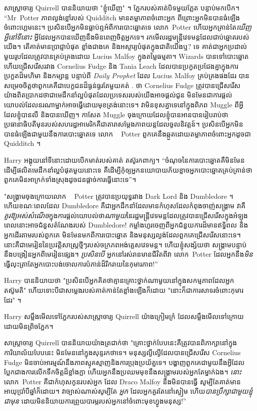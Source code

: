 សាស្រ្តាចារ្យ Quirrell បាននិយាយថា "ខ្ញុំឃើញ" ។ ភ្នែករបស់គាត់បិទមួយភ្លែត បន្ទាប់មកបើក។ “Mr~Potter ភាពល្ងង់ខ្លៅរបស់ Quidditch មានតម្លាភាពចំពោះអ្នក ពីព្រោះអ្នកមិនបានធំឡើងចំពោះហ្គេមនេះ។ ប្រសិនបើអ្នកមិនធ្លាប់ឮអំពីការបោះឆ្នោតទេ លោក~Potter ហើយអ្នកគ្រាន់តែ\emph{ឃើញអ្វីនៅទីនោះ} អ្វីដែលអ្នកបានឃើញនឹងមិនពេញចិត្តអ្នកទេ។ រកមើលរដ្ឋមន្ត្រីវេទមន្តដែលជាប់ឆ្នោតរបស់យើង។ តើ​គាត់​មាន​ប្រាជ្ញា​បំផុត ខ្លាំង​ជាង​គេ និង​អស្ចារ្យ​បំផុត​ក្នុង​ជាតិ​យើង​ឬ? ទេ គាត់​ជា​អ្នក​ប្រដាល់​មួយ​រូប​ដែល​ត្រូវ​បាន​គ្រប់គ្រង​ដោយ​ Lucius Malfoy ក្នុង​តម្លៃ​ធម្មតា​។ Wizards បានទៅបោះឆ្នោត ហើយជ្រើសរើសរវាង Cornelius Fudge និង Tania Leach ដែលបានប្រកួតប្រជែងគ្នាក្នុងការប្រកួតដ៏មហិមា និងកម្សាន្ត បន្ទាប់ពី \emph{Daily Prophet} ដែល Lucius Malfoy គ្រប់គ្រងផងដែរ បានសម្រេចចិត្តថាពួកគេគឺជាបេក្ខជនដ៏ធ្ងន់ធ្ងរតែមួយគត់ . ថា Cornelius Fudge ត្រូវបានជ្រើសរើសយ៉ាងពិតប្រាកដថាជាមេដឹកនាំល្អបំផុតដែលប្រទេសរបស់យើងអាចផ្តល់ជូន មិនមែនជាការផ្តល់យោបល់ដែលនរណាម្នាក់អាចធ្វើដោយមុខត្រង់នោះទេ។ វាមិនខុសគ្នាទេនៅក្នុងពិភព Muggle ពីអ្វីដែលខ្ញុំបានលឺ និងបានឃើញ។ កាសែត Muggle ចុងក្រោយដែលខ្ញុំបានអានបានរៀបរាប់ថាប្រធានាធិបតីមុនរបស់សហរដ្ឋអាមេរិកគឺជាតារាសម្តែងភាពយន្តដែលចូលនិវត្តន៍។ ប្រសិនបើអ្នកមិនបានធំឡើងជាមួយនឹងការបោះឆ្នោតទេ លោក ~ Potter ពួកគេនឹងឆ្កួតដោយតម្លាភាពចំពោះអ្នកដូចជា Quidditch ។

Harry អង្គុយនៅទីនោះដោយបើកមាត់របស់គាត់ តស៊ូរកពាក្យ។ “ចំណុចនៃការបោះឆ្នោតគឺមិនមែនដើម្បីផលិតមេដឹកនាំល្អបំផុតមួយនោះទេ គឺដើម្បីកុំឲ្យអ្នកនយោបាយភ័យខ្លាចអ្នកបោះឆ្នោតគ្រប់គ្រាន់ថាពួកគេមិនអាក្រក់ទាំងស្រុងដូចជនផ្តាច់ការធ្វើនោះទេ”។

"សង្រ្គាមចុងក្រោយលោក ~ Potter ត្រូវបានប្រយុទ្ធរវាង Dark Lord និង Dumbledore ។ ហើយខណៈពេលដែល Dumbledore គឺជាអ្នកដឹកនាំដែលមានកំហុសដែលកំពុងចាញ់សង្រ្គាម វាគឺ\emph{គួរឱ្យអស់សំណើច}ក្នុងការផ្ដល់យោបល់ថា\emph{ណាមួយ}នៃរដ្ឋមន្ត្រីវេទមន្តដែលត្រូវបានជ្រើសរើសក្នុងអំឡុងពេលនោះអាចជំនួសតំណែងរបស់ Dumbledore! កម្លាំងហូរចេញពីអ្នកជំនួយការដ៏មានឥទ្ធិពល និងអ្នកដើរតាមរបស់ពួកគេ មិនមែនមកពីការបោះឆ្នោត និងមនុស្សល្ងង់ដែលពួកគេជ្រើសរើសនោះទេ។ នោះគឺជាមេរៀននៃប្រវត្តិសាស្រ្តថ្មីៗរបស់ចក្រភពអង់គ្លេសវេទមន្ត។ ហើយខ្ញុំសង្ស័យថា សង្រ្គាមបន្ទាប់នឹងបង្រៀនអ្នកពីមេរៀនផ្សេង។ \emph{ប្រសិនបើ} អ្នកនៅរស់រានមានជីវិតពីវា លោក~Potter ដែលអ្នកនឹង\emph{មិន} ធ្វើលុះត្រាតែអ្នកបោះបង់ចោលការបំភាន់ដ៏រីករាយនៃកុមារភាព!”

Harry បាននិយាយថា "ប្រសិនបើអ្នកគិតថាគ្មានគ្រោះថ្នាក់ណាមួយនៅក្នុងសកម្មភាពដែលអ្នកតស៊ូមតិ" ហើយទោះបីជាសម្លេងរបស់គាត់កាន់តែខ្លាំងឡើងក៏ដោយ "នោះក៏ជាការសាទរចំពោះកុមារដែរ" ។

Harry សម្លឹងមើលទៅភ្នែករបស់សាស្រ្តាចារ្យ Quirrell យ៉ាងក្រៀមក្រំ ដែលសម្លឹងមើលទៅក្រោយដោយមិនព្រិចភ្នែក។

សាស្ត្រាចារ្យ Quirrell បាននិយាយយ៉ាងត្រជាក់ថា "គ្រោះថ្នាក់បែបនេះគឺត្រូវបានពិភាក្សានៅក្នុងការិយាល័យបែបនេះ មិនមែននៅក្នុងសុន្ទរកថាទេ។ មនុស្សល្ងីល្ងើដែលបានជ្រើសរើស Cornelius Fudge មិនចាប់អារម្មណ៍នឹងភាពស្មុគស្មាញនិងការប្រុងប្រយ័ត្នទេ។ បង្ហាញពួកគេជាមួយនឹងអ្វីដែលប្លែកជាងការលើកទឹកចិត្តដ៏ខ្លាំងក្លា ហើយអ្នកនឹងប្រឈមមុខនឹងសង្រ្គាមរបស់អ្នកតែម្នាក់ឯង។ \emph{នោះ} លោក~Potter គឺជាកំហុសកូនរបស់អ្នក ដែល Draco Malfoy នឹងមិនបានធ្វើ សូម្បីតែគាត់មានអាយុប្រាំបីឆ្នាំក៏ដោយ។ វាច្បាស់ណាស់សូម្បីតែ \emph{អ្នក} ដែលអ្នកគួរតែនៅស្ងៀម ហើយ\emph{បានប្រឹក្សាជាមួយខ្ញុំជាមុន} ដោយមិននិយាយការព្រួយបារម្ភរបស់អ្នកនៅចំពោះមុខហ្វូងមនុស្ស!”

